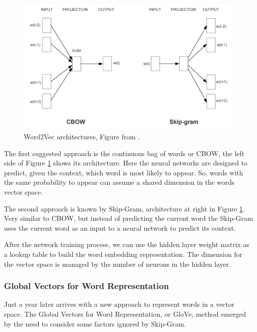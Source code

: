 	\begin{figure}[h!]
		\centering
		\includegraphics[width=0.7\linewidth]{01.Chapters/02.Background/word2vec_architectures}
		\caption{Word2Vec architectures, Figure from  \cite{mikolov2013efficient}.}
		\label{fig:word2vecarchitectures}
	\end{figure}
	
	The first suggested approach is the continuous bag of words or CBOW, the left side of Figure \ref{fig:word2vecarchitectures} shows its architecture. Here the neural networks are designed to predict, given the context, which word is most likely to appear. So, words with the same probability to appear can assume a shared dimension in the words vector space. 

	The second approach is known by Skip-Gram, architecture at right in Figure \ref{fig:word2vecarchitectures}. Very similar to CBOW, but instead of predicting the current word the Skip-Gram uses the current word as an input to a neural network to predict its context.
	
	
	After the network training process, we can use the hidden layer weight matrix as a lookup table to build the word embedding representation. The dimension for the vector space is managed by the number of neurons in the hidden layer. 		
	
	
	\subsubsection{Global Vectors for Word Representation} %
	
	Just a year later  arrives with a new approach to represent words in a vector space. The Global Vectors for Word Representation, or GloVe, method emerged by the need to consider some factors ignored by Skip-Gram.
		
